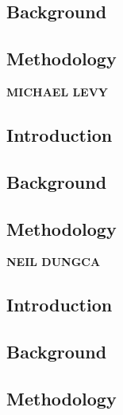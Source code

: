 \documentclass[conference]{IEEEtran}
\begin{document}
\lipsum[11-13]

\subsection{Background}

\lipsum[14-16]

\subsection{Methodology}

\lipsum[17-19]


\vspace{10pt} \LARGE \textbf{MICHAEL LEVY} \normalsize

\subsection{Introduction}

\lipsum[20-22]

\subsection{Background}

\lipsum[23-25]

\subsection{Methodology}

\lipsum[26-28]


\vspace{10pt} \LARGE \textbf{NEIL DUNGCA} \normalsize

\subsection{Introduction}

\lipsum[29-31]

\subsection{Background}

\lipsum[32-34]

\subsection{Methodology}
\end{document}
